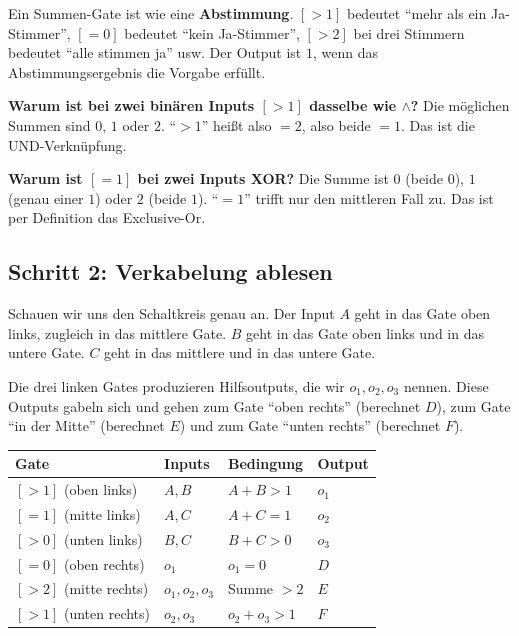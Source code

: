\documentclass[a4paper,12pt]{article}
\begin{document}
\begin{analogie}
Ein Summen-Gate ist wie eine \textbf{Abstimmung}. $[>1]$ bedeutet
"`mehr als ein Ja-Stimmer"', $[=0]$ bedeutet "`kein Ja-Stimmer"',
$[>2]$ bei drei Stimmern bedeutet "`alle stimmen ja"' usw. Der Output
ist $1$, wenn das Abstimmungsergebnis die Vorgabe erf\"ullt.
\end{analogie}

\textbf{Warum ist bei zwei bin\"aren Inputs $[>1]$ dasselbe wie
$\wedge$?} Die m\"oglichen Summen sind $0$, $1$ oder $2$. "`$> 1$"'
hei{\ss}t also $= 2$, also beide $= 1$. Das ist die UND-Verkn\"upfung.

\textbf{Warum ist $[=1]$ bei zwei Inputs XOR?} Die Summe ist $0$
(beide $0$), $1$ (genau einer $1$) oder $2$ (beide $1$). "`$=1$"'
trifft nur den mittleren Fall zu. Das ist per Definition das
Exclusive-Or.

\subsection*{Schritt 2: Verkabelung ablesen}

Schauen wir uns den Schaltkreis genau an. Der Input $A$ geht in das
Gate oben links, zugleich in das mittlere Gate. $B$ geht in das
Gate oben links und in das untere Gate. $C$ geht in das mittlere und
in das untere Gate.

Die drei linken Gates produzieren Hilfsoutputs, die wir $o_1, o_2,
o_3$ nennen. Diese Outputs gabeln sich und gehen zum Gate "`oben
rechts"' (berechnet $D$), zum Gate "`in der Mitte"' (berechnet $E$)
und zum Gate "`unten rechts"' (berechnet $F$).

\begin{center}
\renewcommand{\arraystretch}{1.3}
\begin{tabular}{l|l|l|l}
\toprule
\textbf{Gate} & \textbf{Inputs} & \textbf{Bedingung} & \textbf{Output} \\
\midrule
$[>1]$ (oben links) & $A, B$ & $A + B > 1$ & $o_1$ \\
$[=1]$ (mitte links) & $A, C$ & $A + C = 1$ & $o_2$ \\
$[>0]$ (unten links) & $B, C$ & $B + C > 0$ & $o_3$ \\
$[=0]$ (oben rechts) & $o_1$ & $o_1 = 0$ & $D$ \\
$[>2]$ (mitte rechts) & $o_1, o_2, o_3$ & Summe $> 2$ & $E$ \\
$[>1]$ (unten rechts) & $o_2, o_3$ & $o_2 + o_3 > 1$ & $F$ \\
\bottomrule
\end{tabular}
\end{center}
\end{document}
